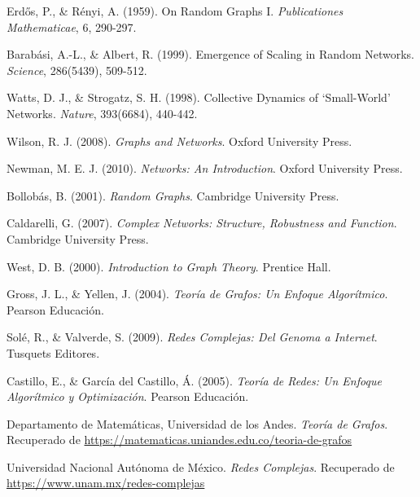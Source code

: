 \begin{thebibliography}{9}
    
Erdős, P., \& Rényi, A. (1959). On Random Graphs I. \textit{Publicationes Mathematicae}, 6, 290-297.

Barabási, A.-L., \& Albert, R. (1999). Emergence of Scaling in Random Networks. \textit{Science}, 286(5439), 509-512.

Watts, D. J., \& Strogatz, S. H. (1998). Collective Dynamics of ‘Small-World’ Networks. \textit{Nature}, 393(6684), 440-442.

    Wilson, R. J. (2008). \textit{Graphs and Networks}. Oxford University Press.
    
    Newman, M. E. J. (2010). \textit{Networks: An Introduction}. Oxford University Press.
    
    Bollobás, B. (2001). \textit{Random Graphs}. Cambridge University Press.
    
    Caldarelli, G. (2007). \textit{Complex Networks: Structure, Robustness and Function}. Cambridge University Press.
    
    West, D. B. (2000). \textit{Introduction to Graph Theory}. Prentice Hall.

Gross, J. L., \& Yellen, J. (2004). \textit{Teoría de Grafos: Un Enfoque Algorítmico}. Pearson Educación.

Solé, R., \& Valverde, S. (2009). \textit{Redes Complejas: Del Genoma a Internet}. Tusquets Editores.

Castillo, E., \& García del Castillo, Á. (2005). \textit{Teoría de Redes: Un Enfoque Algorítmico y Optimización}. Pearson Educación.

Departamento de Matemáticas, Universidad de los Andes. \textit{Teoría de Grafos}. Recuperado de \url{https://matematicas.uniandes.edu.co/teoria-de-grafos}

Universidad Nacional Autónoma de México. \textit{Redes Complejas}. Recuperado de \url{https://www.unam.mx/redes-complejas}

    
    \end{thebibliography}